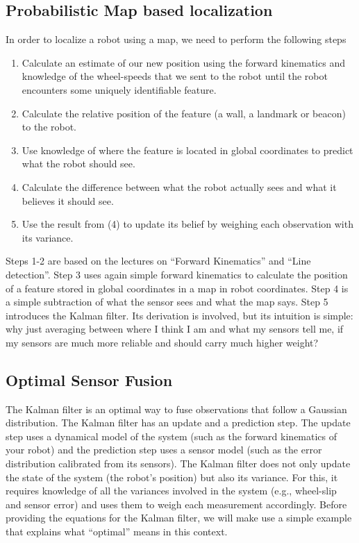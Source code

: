 \subsection{Probabilistic Map based localization}
In order to localize a robot using a map, we need to perform the following steps
\begin{enumerate}
\item Calculate an estimate of our new position using the forward kinematics and knowledge of the wheel-speeds that we sent to the robot until the robot encounters some uniquely identifiable feature.
\item Calculate the relative position of the feature (a wall, a landmark or beacon) to the robot.
\item Use knowledge of where the feature is located in global coordinates to predict what the robot should see.
\item Calculate the difference between what the robot actually sees and what it believes it should see.
\item Use the result from (4) to update its belief by weighing each observation with its variance.
\end{enumerate}

Steps 1-2 are based on the lectures on ``Forward Kinematics'' and ``Line detection''. Step 3 uses again simple forward kinematics to calculate the position of a feature stored in global coordinates in a map in robot coordinates. Step 4 is a simple subtraction of what the sensor sees and what the map says. Step 5 introduces the Kalman filter. Its derivation is involved, but its intuition is simple: why just averaging between where I think I am and what my sensors tell me, if my sensors are much more reliable and should carry much higher weight?

\subsection{Optimal Sensor Fusion}
The Kalman filter is an optimal way to fuse observations that follow a Gaussian distribution. The Kalman filter has an update and a prediction step. The update step uses a dynamical model of the system (such as the forward kinematics of your robot) and the prediction step uses a sensor model (such as the error distribution calibrated from its sensors). The Kalman filter does not only update the state of the system (the robot's position) but also its variance. For this, it requires knowledge of all the variances involved in the system (e.g., wheel-slip and sensor error) and uses them to weigh each measurement accordingly. Before providing the equations for the Kalman filter, we will make use a simple example that explains what ``optimal'' means in this context.

